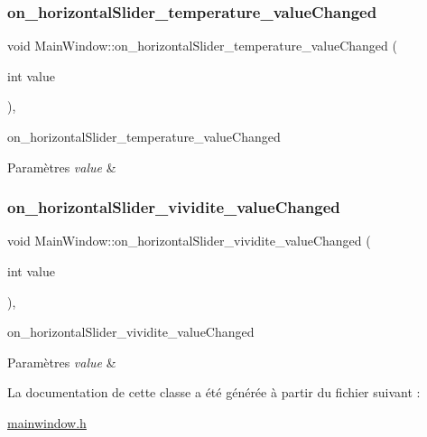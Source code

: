 \subsubsection{\texorpdfstring{on\+\_\+horizontal\+Slider\+\_\+temperature\+\_\+value\+Changed}{on\_horizontalSlider\_temperature\_valueChanged}}
{\footnotesize\ttfamily void Main\+Window\+::on\+\_\+horizontal\+Slider\+\_\+temperature\+\_\+value\+Changed (\begin{DoxyParamCaption}\item[{int}]{value }\end{DoxyParamCaption})\hspace{0.3cm}{\ttfamily [private]}, {\ttfamily [slot]}}



on\+\_\+horizontal\+Slider\+\_\+temperature\+\_\+value\+Changed 


\begin{DoxyParams}{Paramètres}
{\em value} & \\
\hline
\end{DoxyParams}
\mbox{\label{classMainWindow_a942e6acdcf4b25419e338bd17b663930}} 
\subsubsection{\texorpdfstring{on\+\_\+horizontal\+Slider\+\_\+vividite\+\_\+value\+Changed}{on\_horizontalSlider\_vividite\_valueChanged}}
{\footnotesize\ttfamily void Main\+Window\+::on\+\_\+horizontal\+Slider\+\_\+vividite\+\_\+value\+Changed (\begin{DoxyParamCaption}\item[{int}]{value }\end{DoxyParamCaption})\hspace{0.3cm}{\ttfamily [private]}, {\ttfamily [slot]}}



on\+\_\+horizontal\+Slider\+\_\+vividite\+\_\+value\+Changed 


\begin{DoxyParams}{Paramètres}
{\em value} & \\
\hline
\end{DoxyParams}


La documentation de cette classe a été générée à partir du fichier suivant \+:\begin{DoxyCompactItemize}
\item 
\hyperlink{mainwindow_8h}{mainwindow.\+h}\end{DoxyCompactItemize}
